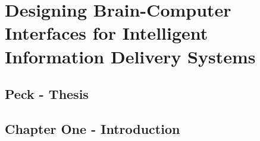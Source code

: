 \documentclass[11pt]{article}
\begin{document}
\section{Designing Brain-Computer Interfaces for Intelligent Information
Delivery
Systems}\label{designing-brain-computer-interfaces-for-intelligent-information-delivery-systems}

\subsection{Peck - Thesis}\label{peck---thesis}

\subsection{Chapter One -
Introduction}\label{chapter-one---introduction}
\end{document}
